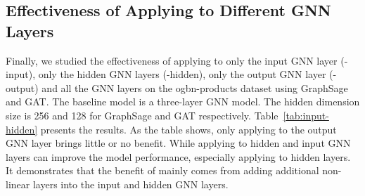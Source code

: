 \subsection{Effectiveness of Applying \method to Different GNN Layers} \label{eval-dgnn}
Finally, we studied the effectiveness of applying \method to only the input GNN layer (\stmethod-input), only the hidden GNN layers (\stmethod-hidden), only the output GNN layer (\stmethod-output) and all the GNN layers on the ogbn-products dataset using GraphSage and GAT. 
The baseline model is a three-layer GNN model. The hidden dimension size is 256 and 128 for GraphSage and GAT respectively.
Table~\ref{tab:input-hidden} presents the results. As the table shows, only applying \method to the output GNN layer brings little or no benefit.
While applying \method to hidden and input GNN layers can improve the model performance, especially applying \method to hidden layers.
It demonstrates that the benefit of \method mainly comes from adding additional non-linear layers into the input and hidden GNN layers.









